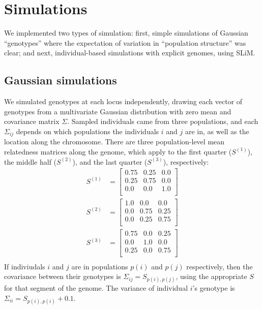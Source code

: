 \documentclass[11pt, oneside]{article}   	%
\begin{document}
\section{Simulations}

We implemented two types of simulation:
first, simple simulations of Gaussian ``genotypes'' 
where the expectation of variation in ``population structure'' was clear;
and next, individual-based simulations with explicit genomes, using SLiM.

\subsection{Gaussian simulations}
\label{apx:gaussian_sims}

We simulated genotypes at each locus independently,
drawing each vector of genotypes from a multivariate Gaussian distribution
with zero mean and covariance matrix $\Sigma$.
Sampled individuals came from three populations,
and each $\Sigma_{ij}$ depends on which populations the individuals $i$ and $j$ are in,
as well as the location along the chromosome.
There are three population-level mean relatedness matrices along the genome,
which apply to the first quarter ($S^{(1)}$),
the middle half ($S^{(2)}$),
and the last quarter ($S^{(3)}$), respectively:
\begin{align*}
    S^{(1)} &= 
    \begin{bmatrix}
        0.75 &  0.25 &  0.0 \\
        0.25 &  0.75 &  0.0 \\
        0.0  &  0.0  &  1.0 \\
    \end{bmatrix} \\
    S^{(2)} &= 
    \begin{bmatrix}
        1.0  &  0.0  &  0.0 \\
        0.0  &  0.75 &  0.25\\
        0.0  &  0.25 &  0.75\\
    \end{bmatrix} \\
    S^{(3)} &= 
    \begin{bmatrix}
        0.75 &  0.0  &  0.25\\
        0.0  &  1.0  &  0.0 \\
        0.25 &  0.0  &  0.75\\
    \end{bmatrix} \\
\end{align*}
If indiviudals $i$ and $j$ are in populations $p(i)$ and $p(j)$ respectively,
then the covariance between their genotypes is $\Sigma_{ij} = S_{p(i),p(j)}$, 
using the appropriate $S$ for that segment of the genome.
The variance of individual $i$'s genotype is $\Sigma_{ii} = S_{p(i),p(i)} + 0.1$.
\end{document}
